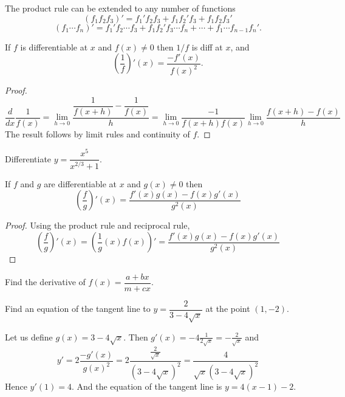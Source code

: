 \documentclass[../main.tex]{subfiles}
\begin{document}
  The product rule can be extended to any number of functions
  \[
    (f_1 f_2 f_3)' = f_1' f_2 f_3 + f_1 f_2' f_3  + f_1 f_2 f_3'
  \]
  \[
    (f_1 \cdots f_n)' = f_1' f_2 \cdots f_3 + f_1 f_2' f_3 \cdots f_n + \cdots + f_1 \cdots f_{n-1} f_n'.
  \]

  \begin{theorem}
    If $f$ is differentiable at $x$ and $f(x) \neq 0$ then $1/f$ is diff at $x$, and
    \[
      \left(\dfrac{1}{f} \right)'(x) = \dfrac{-f'(x)}{f(x)^2}.
    \]
  \end{theorem}
  \begin{proof}
    \[
      \dfrac{d}{dx} \dfrac{1}{f(x)} = \lim_{h \to 0} \frac{\dfrac{1}{f(x+h)}-\dfrac{1}{f(x)}}{h} = \lim_{h \to 0} \dfrac{-1}{f(x+h) f(x)} \lim_{h \to 0} \dfrac{f(x+h)-f(x)}{h}
    \]
    The result follows by limit rules and continuity of $f$.
  \end{proof}

  \begin{example}
    Differentiate $y = \dfrac{x^5}{x^{2/3} + 1}$.
  \end{example}

  \begin{theorem}
    If $f$ and $g$ are differentiable at $x$ and $g(x) \neq 0$ then
    \[
      \left( \dfrac{f}{g} \right)'(x) =
      \dfrac{f'(x) g(x) - f(x) g'(x)}{g^2(x)}
    \]
  \end{theorem}
  \begin{proof}
    Using the product rule and reciprocal rule,
    \[
      \left( \dfrac{f}{g} \right)'(x) = \left( \dfrac{1}{g}(x) f(x) \right)' = \dfrac{f'(x) g(x) - f(x) g'(x)}{g^2(x)}
    \]
  \end{proof}

  \begin{example}
    Find the derivative of $f(x) = \dfrac{a + b x}{m + c x}$.
  \end{example}

  \begin{example}
    Find an equation of the tangent line to $y = \dfrac{2}{3-4 \sqrt{x}}$ at the point $(1, -2)$.
  \end{example}
  \begin{solution}
    Let us define $g(x)=3-4\sqrt{x}$. Then $g'(x)=-4 \frac{1}{2\sqrt{x}}=-\frac{2}{\sqrt{x}}$ and
    \[
      y'=2 \frac{-g'(x)}{g(x)^2}
      =2 \frac{\frac{2}{\sqrt{x}}}{(3-4\sqrt{x})^2}
      =\frac{4}{\sqrt{x}(3-4\sqrt{x})^2}
    \]
    Hence $y'(1)=4$. And the equation of the tangent line is $y=4(x-1)-2$.
  \end{solution}
\end{document}
